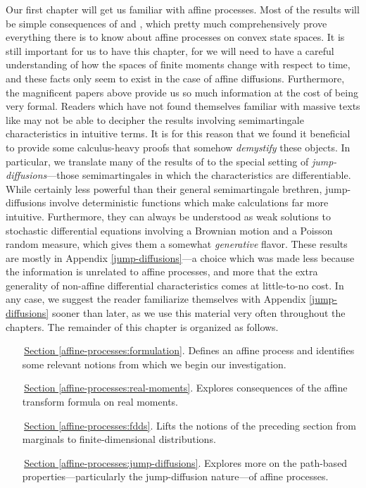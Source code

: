 Our first chapter will get us familiar with affine processes.
Most of the results will be simple consequences of \cite{cuchiero2011} and \cite{keller2015}, which pretty much comprehensively prove everything there is to know about affine processes on convex state spaces.
It is still important for us to have this chapter, for we will need to have a careful understanding of how the spaces of finite moments change with respect to time, and these facts only seem to exist in the case of affine diffusions.
Furthermore, the magnificent papers above provide us so much information at the cost of being very formal.
Readers which have not found themselves familiar with massive texts like \cite{jacod2003} may not be able to decipher the results involving semimartingale characteristics in intuitive terms.
It is for this reason that we found it beneficial to provide some calculus-heavy proofs that somehow \emph{demystify} these objects.
In particular, we translate many of the results of \cite{jacod2003} to the special setting of \emph{jump-diffusions}---those semimartingales in which the characteristics are differentiable.
While certainly less powerful than their general semimartingale brethren, jump-diffusions involve deterministic functions which make calculations far more intuitive.
Furthermore, they can always be understood as weak solutions to stochastic differential equations involving a Brownian motion and a Poisson random measure, which gives them a somewhat \emph{generative} flavor.
These results are mostly in Appendix \ref{jump-diffusions}---a choice which was made less because the information is unrelated to affine processes, and more that the extra generality of non-affine differential characteristics comes at little-to-no cost.
In any case, we suggest the reader familiarize themselves with Appendix \ref{jump-diffusions} sooner than later, as we use this material very often throughout the chapters.
The remainder of this chapter is organized as follows.

\begin{enumerate}[leftmargin=20mm]
  \item[\,{\hyperref[affine-processes:formulation]{Section }}\ref{affine-processes:formulation}.]
    Defines an affine process and identifies some relevant notions from which we begin our investigation.
  \item[\,{\hyperref[affine-processes:real-moments]{Section }}\ref{affine-processes:real-moments}.]
    Explores consequences of the affine transform formula on real moments.
  \item[\,{\hyperref[affine-processes:fdds]{Section }}\ref{affine-processes:fdds}.]
    Lifts the notions of the preceding section from marginals to finite-dimensional distributions.
  \item[\,{\hyperref[affine-processes:jump-diffusions]{Section }}\ref{affine-processes:jump-diffusions}.]
    Explores more on the path-based properties---particularly the jump-diffusion nature---of affine processes.
\end{enumerate}
